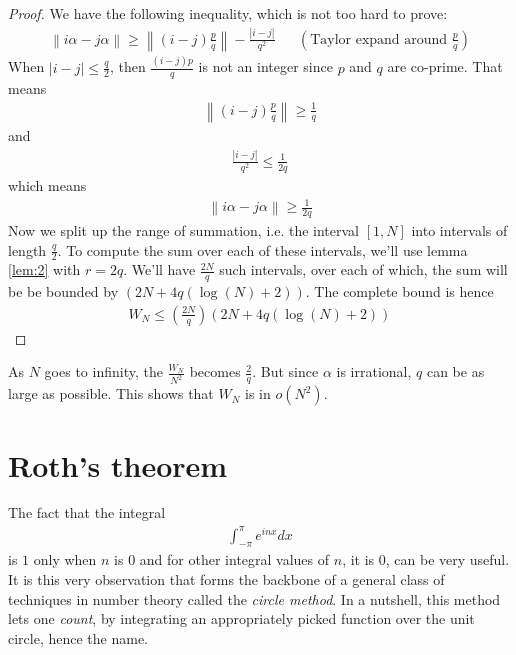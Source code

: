 \documentclass[12pt, titlepage]{article}
\theoremstyle{definition}
\newcommand{\norm}[1]{\left\lVert#1\right\rVert}
\begin{document}
\begin{proof}
    We have the following inequality, which is not too hard to prove:
    \begin{align*}
        \norm{i\alpha - j\alpha} \geq \norm{(i-j)\frac{p}{q}} - \frac{|i-j|}{q^2} &&\left(\text{Taylor expand around $\frac{p}{q}$}\right)
    \end{align*}
    When $|i-j| \leq \frac{q}{2}$, then $\frac{(i-j)p}{q}$ is not an integer since $p$ and $q$ are co-prime. That means
    \begin{align*}
        \norm{(i-j)\frac{p}{q}} \geq \frac{1}{q}
    \end{align*}
    and 
    \begin{align*}
        \frac{|i-j|}{q^2} \leq \frac{1}{2q}
    \end{align*}
    which means
    \begin{align*}
        \norm{i\alpha - j\alpha} \geq \frac{1}{2q}
    \end{align*}
    Now we split up the range of summation, i.e. the interval $[1, N]$ into intervals of length $\frac{q}{2}$. To compute the sum over each of these intervals, we'll use lemma \ref{lem:2} with $r = 2q$. We'll have $\frac{2N}{q}$ such intervals, over each of which, the sum will be be bounded by $\left( 2N +4q(\log(N) +2) \right)$. The complete bound is hence
    \begin{align*}
        W_N \leq \left( \frac{2N}{q}\right) \left( 2N +4q(\log(N) +2) \right)
    \end{align*}
\end{proof}
As $N$ goes to infinity, the $\frac{W_N}{N^2}$ becomes $\frac{2}{q}$. But since $\alpha$ is irrational, $q$ can be as large as possible. This shows that $W_N$ is in $o(N^2)$.

\newpage

\section{Roth's theorem}
The fact that the integral
\begin{align*}
    \int_{-\pi}^{\pi} e^{inx} dx
\end{align*}
is $1$ only when $n$ is $0$ and for other integral values of $n$, it is $0$, can be very useful. It is this very observation that forms the backbone of a general class of techniques in number theory called the \emph{circle method}. In a nutshell, this method lets one \emph{count}, by integrating an appropriately picked function over the unit circle, hence the name.
\end{document}
